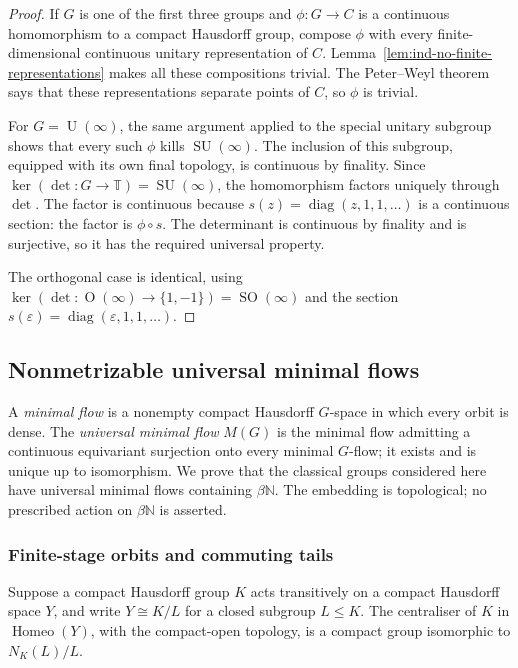 \begin{proof}
If $G$ is one of the first three groups and $\phi:G\to C$ is a
continuous homomorphism to a compact Hausdorff group, compose $\phi$
with every finite-dimensional continuous unitary representation of
$C$. Lemma~\ref{lem:ind-no-finite-representations} makes all these
compositions trivial. The Peter--Weyl theorem says that these
representations separate points of $C$, so $\phi$ is trivial.

For $G=\operatorname{U}(\infty)$, the same argument applied to the special unitary
subgroup shows that every such $\phi$ kills $\operatorname{SU}(\infty)$. The
inclusion of this subgroup, equipped with its own final topology, is
continuous by finality. Since
$\ker(\det:G\to\mathbb T)=\operatorname{SU}(\infty)$, the homomorphism factors uniquely
through $\det$. The factor is continuous because
$s(z)=\operatorname{diag}(z,1,1,\ldots)$ is a continuous section: the factor is
$\phi\circ s$. The determinant is continuous by finality and is
surjective, so it has the required universal property.

The orthogonal case is identical, using
$\ker(\det:\operatorname{O}(\infty)\to\{1,-1\})=\operatorname{SO}(\infty)$ and the section
$s(\varepsilon)=\operatorname{diag}(\varepsilon,1,1,\ldots)$.
\end{proof}


\subsection{Nonmetrizable universal minimal flows}\label{sec:ind-umf}

A \emph{minimal flow} is a nonempty compact Hausdorff $G$-space in
which every orbit is dense. The \emph{universal minimal flow} $M(G)$
is the minimal flow admitting a continuous equivariant surjection onto
every minimal $G$-flow; it exists and is unique up to isomorphism.
We prove that the classical groups considered here have universal
minimal flows containing $\beta\mathbb N$. The embedding is topological;
no prescribed action on $\beta\mathbb N$ is asserted.


\subsubsection{Finite-stage orbits and commuting tails}

\begin{lemma}\label{lem:ind-compact-centralizer}
Suppose a compact Hausdorff group $K$ acts transitively on a compact
Hausdorff space $Y$, and write $Y\cong K/L$ for a closed subgroup
$L\le K$. The centraliser of $K$ in $\operatorname{Homeo}(Y)$, with the compact-open
topology, is a compact group isomorphic to $N_K(L)/L$.
\end{lemma}

